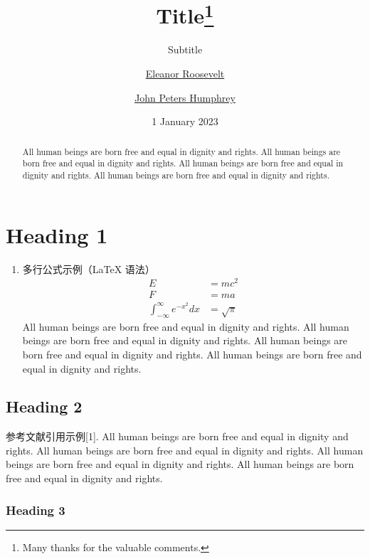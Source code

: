 \documentclass[
  ngerman,
  american,
  ]{scrartcl}
\title{Title\thanks{Many thanks for the valuable comments.}}
\subtitle{Subtitle}
\author{\href{eleanor.eoosevelt@domain.com}{Eleanor
Roosevelt} \and \href{jph@domain.com}{John Peters Humphrey}}
\date{1 January 2023}
\providecommand{\tightlist}{%
  \setlength{\itemsep}{0pt}\setlength{\parskip}{0pt}}
\begin{document}
\maketitle
\begin{abstract}
All human beings are born free and equal in dignity and rights. All
human beings are born free and equal in dignity and rights. All human
beings are born free and equal in dignity and rights. All human beings
are born free and equal in dignity and rights.
\end{abstract}



\renewcommand*\contentsname{Contents}
{
\setcounter{tocdepth}{2}
\tableofcontents
}
\listoffigures
\listoftables
\section{Heading 1}\label{heading-1}

\begin{enumerate}
\def\labelenumi{\arabic{enumi}.}
\tightlist
\item
  多行公式示例（LaTeX 语法）
  \begin{align}
  E &= mc^2 \label{eq:emc2} \\
  F &= ma \label{eq:newton} \\
  \int_{-\infty}^{\infty} e^{-x^2} dx &= \sqrt{\pi} \label{eq:gauss}
  \end{align}
  All human beings are born free and equal in dignity and rights. All
  human beings are born free and equal in dignity and rights. All human
  beings are born free and equal in dignity and rights. All human beings
  are born free and equal in dignity and rights.
\end{enumerate}

\subsection{Heading 2}\label{heading-2}

参考文献引用示例{[}1{]}. All human beings are born free and equal in
dignity and rights. All human beings are born free and equal in dignity
and rights. All human beings are born free and equal in dignity and
rights. All human beings are born free and equal in dignity and rights.

\subsubsection{Heading 3}\label{heading-3}
\end{document}

